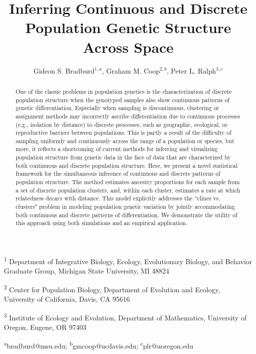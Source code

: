 \documentclass[12pt]{article}
\title{Inferring Continuous and Discrete Population Genetic Structure Across Space}
\date{\vspace{-5ex}}
\author{
Gideon S. Bradburd$^{1,a}$, 
Graham M. Coop$^{2,b}$,
Peter L. Ralph$^{3,c}$}
\begin{document}
\maketitle

\textsuperscript{1}
Department of Integrative Biology, 
Ecology, Evolutionary Biology, and Behavior Graduate Group,
Michigan State University, MI 48824

\textsuperscript{2}
Center for Population Biology,
Department of Evolution and Ecology, 
University of California, Davis, CA 95616

\textsuperscript{3}
Institute of Ecology and Evolution,
Department of Mathematics,
University of Oregon, Eugene, OR 97403

\textsuperscript{a}bradburd@msu.edu; 
\textsuperscript{b}gmcoop@ucdavis.edu;
\textsuperscript{c}plr@uoregon.edu\\\\\

\newpage
 

\begin{abstract}
One of the classic problems in population genetics is the characterization 
of discrete population structure when the genotyped samples also show 
continuous patterns of genetic differentiation.
Especially when sampling is discontinuous, 
clustering or assignment methods may incorrectly ascribe differentiation 
due to continuous processes (e.g., isolation by distance) 
to discrete processes, such as geographic, ecological, or reproductive barriers 
between populations.
This is partly a result of the difficulty of sampling uniformly and continuously 
across the range of a population or species, 
but more, it reflects a shortcoming of current methods for inferring and 
visualizing population structure from genetic data in the face of data 
that are characterized by both continuous and discrete population structure.
Here, we present a novel statistical framework for the simultaneous inference 
of continuous and discrete patterns of population structure.
The method estimates ancestry proportions for each 
sample from a set of discrete population clusters, 
and, within each cluster, estimates a rate at which relatedness decays with distance.
This model explicitly addresses the ``clines vs. clusters" problem in 
modeling population genetic variation by jointly accommodating both 
continuous and discrete patterns of differentiation. 
We demonstrate the utility of this approach using both simulations and an empirical application.
\end{abstract}
\end{document}
